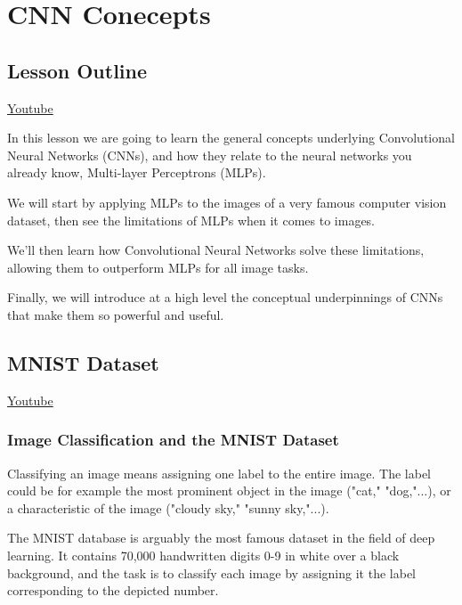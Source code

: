 \chapter{CNN Conecepts}

\section{Lesson Outline}
\href{https://www.youtube.com/watch?v=zS4iCL3lDtU&ab_channel=Udacity}{Youtube} \newline

In this lesson we are going to learn the general concepts underlying Convolutional Neural Networks (CNNs), and how they relate to the neural networks you already know, Multi-layer Perceptrons (MLPs).\newline

We will start by applying MLPs to the images of a very famous computer vision dataset, then see the limitations of MLPs when it comes to images.\newline

We'll then learn how Convolutional Neural Networks solve these limitations, allowing them to outperform MLPs for all image tasks.\newline

Finally, we will introduce at a high level the conceptual underpinnings of CNNs that make them so powerful and useful.

\section{MNIST Dataset}
\href{https://www.youtube.com/watch?v=a7bvIGZpcnk&t=1s&ab_channel=Udacity}{Youtube} 

\subsection{Image Classification and the MNIST Dataset}

Classifying an image means assigning one label to the entire image. The label could be for example the most prominent object in the image ("cat," "dog,"...), or a characteristic of the image ("cloudy sky," "sunny sky,"...).

The MNIST database is arguably the most famous dataset in the field of deep learning. It contains 70,000 handwritten digits 0-9 in white over a black background, and the task is to classify each image by assigning it the label corresponding to the depicted number.

